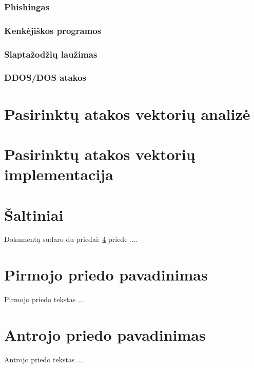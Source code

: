 \documentclass[a4paper,12pt,fleqn]{article}
\begin{document}
\subsubsection{Phishingas}
\subsubsection{Kenkėjiškos programos}
\subsubsection{Slaptažodžių laužimas}
\subsubsection{DDOS/DOS atakos}
\section{Pasirinktų atakos vektorių analizė}

\section{Pasirinktų atakos vektorių implementacija}

\section{Šaltiniai}






\newpage
\begin{appendices}
Dokumentą sudaro du priedai: \ref{app:a} priede  ....
\newpage
\section{Pirmojo priedo pavadinimas}
\label{app:a}
Pirmojo priedo tekstas ...

\newpage
\section{Antrojo priedo pavadinimas}
Antrojo priedo tekstas ...

\end{appendices}
\end{document}
